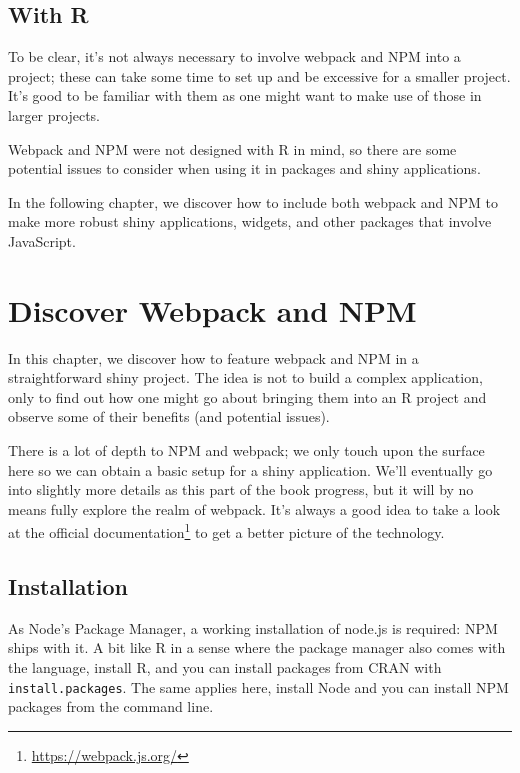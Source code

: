 \documentclass[
]{krantz}
\renewcommand{\href}[2]{#2\footnote{\url{#1}}}
\begin{document}
\hypertarget{webpack-conclude}{%
\section{With R}\label{webpack-conclude}}

To be clear, it's not always necessary to involve webpack and NPM into a project; these can take some time to set up and be excessive for a smaller project. It's good to be familiar with them as one might want to make use of those in larger projects.

Webpack and NPM were not designed with R in mind, so there are some potential issues to consider when using it in packages and shiny applications.

In the following chapter, we discover how to include both webpack and NPM to make more robust shiny applications, widgets, and other packages that involve JavaScript.

\hypertarget{webpack-intro-discover}{%
\chapter{Discover Webpack and NPM}\label{webpack-intro-discover}}

In this chapter, we discover how to feature webpack and NPM in a straightforward shiny project. The idea is not to build a complex application, only to find out how one might go about bringing them into an R project and observe some of their benefits (and potential issues).

There is a lot of depth to NPM and webpack; we only touch upon the surface here so we can obtain a basic setup for a shiny application. We'll eventually go into slightly more details as this part of the book progress, but it will by no means fully explore the realm of webpack. It's always a good idea to take a look at the \href{https://webpack.js.org/}{official documentation} to get a better picture of the technology.

\hypertarget{webpack-intro-install}{%
\section{Installation}\label{webpack-intro-install}}

As Node's Package Manager, a working installation of node.js is required: NPM ships with it. A bit like R in a sense where the package manager also comes with the language, install R, and you can install packages from CRAN with \texttt{install.packages}. The same applies here, install Node and you can install NPM packages from the command line.
\end{document}
